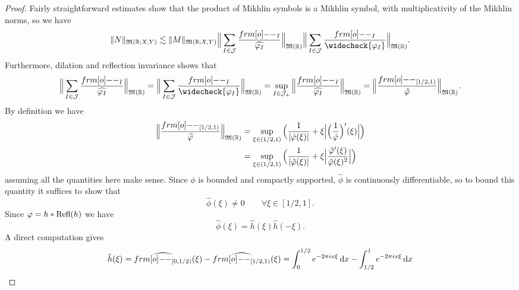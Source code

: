 \begin{proof}
  Fairly straightforward estimates show that the product of Mikhlin symbols is a Mikhlin symbol, with multiplicativity of the Mikhlin norms, so we have
  \begin{equation*}
     \|N\|_{\mf{M}(\R;X,Y)} \lesssim \|M\|_{\mf{M}(\R;X,Y)} \Big\| \sum_{I \in \mc{J}} \frac{\1_{I} }{\widehat{\phi_{I}}} \Big\|_{\mf{M}(\R)} \Big\| \sum_{I \in \mc{J}} \frac{\1_{I} }{\widecheck{\phi_{I}}} \Big\|_{\mf{M}(\R)}.
   \end{equation*}
   Furthermore, dilation and reflection invariance shows that
   \begin{equation*}
     \Big\| \sum_{I \in \mc{J}} \frac{\1_{I} }{\widehat{\phi_{I}}} \Big\|_{\mf{M}(\R)}
     = \Big\| \sum_{I \in \mc{J}} \frac{\1_{I} }{\widecheck{\phi_{I}}} \Big\|_{\mf{M}(\R)}
     = \sup_{I \in \mc{J_{+}}} \Big\| \frac{\1_{I}}{\widehat{\phi_{I}}} \Big\|_{\mf{M}(\R)}
     = \Big\| \frac{\1_{[1/2,1)}}{\hat{\phi}} \Big\|_{\mf{M}(\R)}.
   \end{equation*}
   By definition we have
   \begin{equation*}
     \begin{aligned}
       \Big\| \frac{\1_{[1/2,1)}}{\widehat{\phi}} \Big\|_{\mf{M}(\R)}
       &= \sup_{\xi \in (1/2, 1)} \Big( \frac{1}{|\hat{\phi}(\xi)|}  + \xi\Big|\Big(\frac{1}{\hat{\phi}}\Big)'(\xi) \Big| \Big) \\
       &= \sup_{\xi \in (1/2, 1)} \Big( \frac{1}{|\hat{\phi}(\xi)|}  + \xi\Big|\frac{\hat{\phi}'(\xi)}{\hat{\phi}(\xi)^2}\Big| \Big)
   \end{aligned}
   \end{equation*}
   assuming all the quantities here make sense.
   Since $\phi$ is bounded and compactly supported, $\hat{\phi}$ is continuously differentiable, so to bound this quantity it suffices to show that
   \begin{equation}\label{eq:phi-0}
     \hat{\phi}(\xi) \neq 0 \qquad \forall \xi \in [1/2, 1].
   \end{equation}
   Since $\varphi = h \ast \operatorname{Refl}(h)$ we have
   \begin{equation*}
     \hat{\phi}(\xi) = \hat{h}(\xi) \hat{h}(-\xi).
   \end{equation*}
   A direct computation gives
   \begin{equation*}
     \begin{aligned}
     \hat{h}(\xi) = \widehat{\1_{[0,1/2)}}(\xi) - \widehat{\1_{[1/2,1)}}(\xi)
     &= \int_{0}^{1/2} e^{-2\pi i x \xi} \, \dd x - \int_{1/2}^{1} e^{-2\pi i x \xi} \, \dd x \\

\end{aligned}
\end{equation*}
\end{proof}
